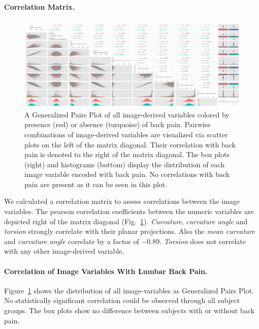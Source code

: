 \documentclass[a4paper,twoside]{style/article}
\begin{document}
\paragraph{Correlation Matrix.}
\begin{figure}[htb]
  \centering
  \includegraphics[width=1.0\textwidth]{figures/image-parameter-range}
  \caption{
A Generalized Pairs Plot of all image-derived variables colored by presence (red) or absence (turquoise) of back pain.
Pairwise combinations of image-derived variables are visualized via scatter plots on the left of the matrix diagonal.
Their correlation with back pain is denoted to the right of the matrix diagonal.
The box plots (right) and histograms (bottom) display the distribution of each image variable encoded with back pain.
No correlations with back pain are present as it can be seen in this plot.
}
  \label{fig:image-parameter-range}
\end{figure}
We calculated a correlation matrix to assess correlations between the image variables.
The pearson correlation coefficients between the numeric variables are depicted right of the matrix diagonal (Fig.~\ref{fig:image-parameter-range}).
\emph{Curvature}, \emph{curvature angle} and \emph{torsion} strongly correlate with their planar projections.
Also the \emph{mean curvature} and \emph{curvature angle} correlate by a factor of $-0.89$.
\emph{Torsion} does not correlate with any other image-derived variable.
\paragraph{Correlation of Image Variables With Lumbar Back Pain.}
Figure~\ref{fig:image-parameter-range} shows the distribution of all image-variables as Generalized Pairs Plot.
No statistically significant correlation could be observed through all subject groups.
The box plots show no difference between subjects with or without back pain.
\end{document}
